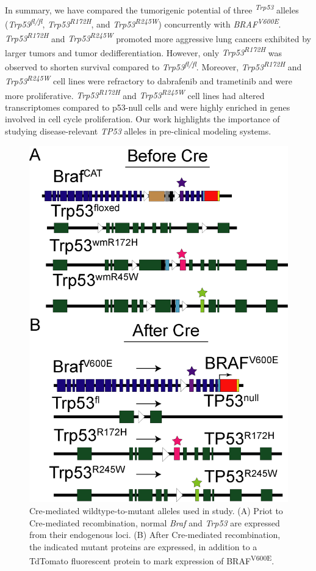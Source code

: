 In summary, we have compared the tumorigenic potential of three \emph{\textsuperscript{Trp53}} alleles (\emph{Trp53\textsuperscript{fl/fl}}, \emph{Trp53\textsuperscript{R172H}}, and \emph{Trp53\textsuperscript{R245W}}) concurrently with \emph{BRAF\textsuperscript{V600E}}. \emph{Trp53\textsuperscript{R172H}} and \emph{Trp53\textsuperscript{R245W}} promoted more aggressive lung cancers exhibited by larger tumors and tumor dedifferentiation. However, only \emph{Trp53\textsuperscript{R172H}} was observed to shorten survival compared to \emph{Trp53\textsuperscript{fl/fl}}. Moreover, \emph{Trp53\textsuperscript{R172H}} and \emph{Trp53\textsuperscript{R245W}} cell lines were refractory to dabrafenib and trametinib and were more proliferative. \emph{Trp53\textsuperscript{R172H}} and \emph{Trp53\textsuperscript{R245W}} cell lines had altered transcriptomes compared to p53-null cells and were highly enriched in genes involved in cell cycle proliferation. Our work highlights the importance of studying disease-relevant \emph{TP53} alleles in pre-clinical modeling systems.

\begin{figure}
\hypertarget{fig:3.1}{%
\centering
\includegraphics[width=1\textwidth,height=\textheight]{images/p53_1.png}
\caption{Cre-mediated wildtype-to-mutant alleles used in study. (A) Priot to Cre-mediated recombination, normal \emph{Braf} and \emph{Trp53} are expressed from their endogenous loci. (B) After Cre-mediated recombination, the indicated mutant proteins are expressed, in addition to a TdTomato fluorescent protein to mark expression of BRAF\textsuperscript{V600E}.}\label{fig:3.1}
}
\end{figure}

